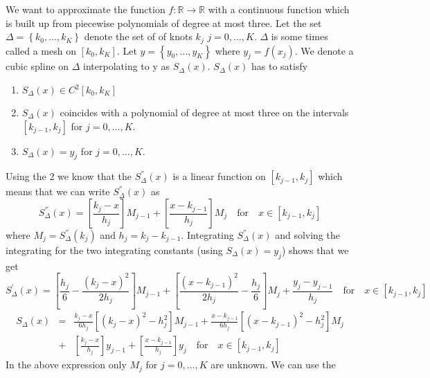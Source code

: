 \documentclass[12pt]{article}
\begin{document}
We want to approximate the function $f: \mathbb{R} \rightarrow \mathbb{R}$ with a continuous function which is built up from piecewise  polynomials of degree at most three. 
Let the set $\Delta = \left\{ k_0, \ldots, k_K \right\} $ denote the set of of knots $k_j$ $j=0, \ldots , K$. $\Delta$ is some times called a mesh on $\left[k_0 , k_K \right]$. Let $y = \left\{ y_0, \ldots, y_K \right\} $ where $y_j = f(x_j)$. We denote a cubic spline on $\Delta$ interpolating to y as $S_{\Delta}(x)$. $S_{\Delta}(x)$ has to satisfy 
\begin{enumerate}
\item $S_{\Delta}(x) \in C^{2}\left[ k_0 , k_K \right] $
\item $S_{\Delta}(x)$ coincides with a polynomial of degree at most three on the intervals $\left[ k_{j-1} , k_j \right]$ for $j=0, \ldots ,K$. 
\item $S_{\Delta}(x)= y_j$  for $j=0, \ldots ,K$. 
\end{enumerate}
Using the 2 we know that the $S^{''}_{\Delta}(x)$ is a linear function on  $\left[ k_{j-1} , k_j \right]$ which means that we can write $S^{''}_{\Delta}(x)$ as 
\begin{equation}
S^{''}_{\Delta}(x) = \left[ \frac{k_j - x }{h_j} \right] M_{j-1} + \left[ \frac{ x - k_{j-1} }{h_j} \right] M_{j}  \quad \text{for} \quad x \in \left[ k_{j-1} , k_j \right]
\end{equation}
where $M_j = S^{''}_{\Delta}(k_j)$ and $h_j = k_j - k_{j-1}$. Integrating $S^{''}_{\Delta}(x) $ and solving the integrating for the two integrating constants (using $S_{\Delta}(x)= y_j$) \citet{Poirier1973} shows that  we get 
\begin{equation}
S^{'}_{\Delta}(x) = \left[ \frac{h_j}{6} - \frac{(k_j - x)^2 }{2 h_j} \right] M_{j-1} + \left[ \frac{ (x - k_{j-1})^2 }{2 h_j} - \frac{h_j}{6} \right] M_{j} + \frac{y_j - y_{j-1}}{h_j} \quad \text{for} \quad x \in \left[ k_{j-1} , k_j \right]
\end{equation}
\begin{eqnarray}
S_{\Delta}(x) &=&  \frac{k_j - x}{ 6 h_j }\left[ (k_j - x)^2 - h^{2}_j \right] M_{j-1} + \frac{x - k_{j-1}}{ 6 h_j }\left[ (x -k_{j-1} )^2 - h^{2}_j \right] M_{j} \nonumber \\
 &+& \left[  \frac{k_j - x}{ h_j }\right] y_{j-1} + \left[  \frac{ x - k_{j-1}}{ h_j }\right] y_{j} \quad \text{for} \quad x \in \left[ k_{j-1} , k_j \right]
 \label{c_eq:spline}
\end{eqnarray}
In the above expression only $M_{j}$ for  $j= 0 , \ldots , K$ are unknown. We can use the 
\end{document}
